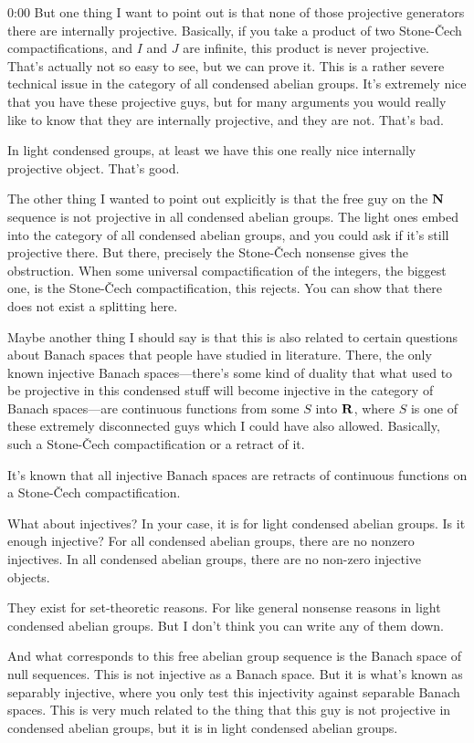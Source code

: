 \begin{unfinished}{0:00}
But one thing I want to point out is that none of those projective generators there are internally projective. Basically, if you take a product of two Stone-Čech compactifications, and $I$ and $J$ are infinite, this product is never projective. That's actually not so easy to see, but we can prove it. This is a rather severe technical issue in the category of all condensed abelian groups. It's extremely nice that you have these projective guys, but for many arguments you would really like to know that they are internally projective, and they are not. That's bad.

In light condensed groups, at least we have this one really nice internally projective object. That's good.

The other thing I wanted to point out explicitly is that the free guy on the $\mathbf N$ sequence is not projective in all condensed abelian groups. The light ones embed into the category of all condensed abelian groups, and you could ask if it's still projective there. But there, precisely the Stone-Čech nonsense gives the obstruction. When some universal compactification of the integers, the biggest one, is the Stone-Čech compactification, this rejects. You can show that there does not exist a splitting here.

Maybe another thing I should say is that this is also related to certain questions about Banach spaces that people have studied in literature. There, the only known injective Banach spaces—there's some kind of duality that what used to be projective in this condensed stuff will become injective in the category of Banach spaces—are continuous functions from some $S$ into $\mathbf R$, where $S$ is one of these extremely disconnected guys which I could have also allowed. Basically, such a Stone-Čech compactification or a retract of it.

It's known that all injective Banach spaces are retracts of continuous functions on a Stone-Čech compactification.

What about injectives? In your case, it is for light condensed abelian groups. Is it enough injective? For all condensed abelian groups, there are no nonzero injectives. In all condensed abelian groups, there are no non-zero injective objects.

They exist for set-theoretic reasons. For like general nonsense reasons in light condensed abelian groups. But I don't think you can write any of them down.

And what corresponds to this free abelian group sequence is the Banach space of null sequences. This is not injective as a Banach space. But it is what's known as separably injective, where you only test this injectivity against separable Banach spaces. This is very much related to the thing that this guy is not projective in condensed abelian groups, but it is in light condensed abelian groups.


\end{unfinished}
